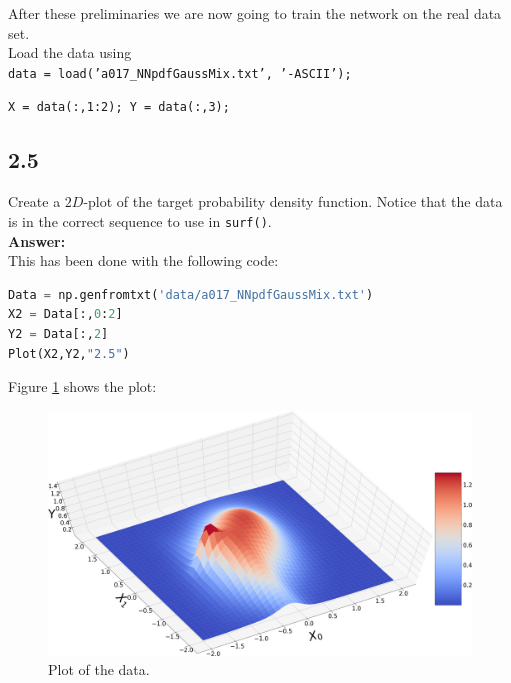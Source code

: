 \documentclass[a4paper]{article}
\begin{document}
After these preliminaries we are now going to train the network on the real data set.\\
Load the data using\\


\hspace{1cm} \texttt{data = load('a017\_NNpdfGaussMix.txt', '-ASCII');}

\hspace{1cm} \texttt{X = data(:,1:2); Y = data(:,3);}\\







\subsection*{2.5}

Create a $2D$-plot of the target probability density function. Notice that the data is in the correct sequence to use in \texttt{surf()}.\\

\textbf{Answer:}\\

This has been done with the following code:

\begin{lstlisting}[language=Python]
Data = np.genfromtxt('data/a017_NNpdfGaussMix.txt')
X2 = Data[:,0:2]
Y2 = Data[:,2]
Plot(X2,Y2,"2.5")
\end{lstlisting}


Figure \ref{2.5} shows the plot:

\begin{figure}[H]
\includegraphics[width=\textwidth]{Images/2,5.png}
\caption{Plot of the data.}
\label{2.5}
\end{figure}
\end{document}
